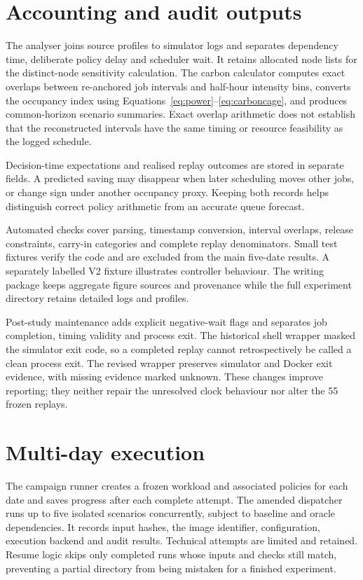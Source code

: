 \section{Accounting and audit outputs}
The analyser joins source profiles to simulator logs and separates dependency time, deliberate policy delay and scheduler wait. It retains allocated node lists for the distinct-node sensitivity calculation. The carbon calculator computes exact overlaps between re-anchored job intervals and half-hour intensity bins, converts the occupancy index using Equations~\ref{eq:power}--\ref{eq:carboncage}, and produces common-horizon scenario summaries. Exact overlap arithmetic does not establish that the reconstructed intervals have the same timing or resource feasibility as the logged schedule.

Decision-time expectations and realised replay outcomes are stored in separate fields. A predicted saving may disappear when later scheduling moves other jobs, or change sign under another occupancy proxy. Keeping both records helps distinguish correct policy arithmetic from an accurate queue forecast.

Automated checks cover parsing, timestamp conversion, interval overlaps, release constraints, carry-in categories and complete replay denominators. Small test fixtures verify the code and are excluded from the main five-date results. A separately labelled V2 fixture illustrates controller behaviour. The writing package keeps aggregate figure sources and provenance while the full experiment directory retains detailed logs and profiles.

Post-study maintenance adds explicit negative-wait flags and separates job completion, timing validity and process exit. The historical shell wrapper masked the simulator exit code, so a completed replay cannot retrospectively be called a clean process exit. The revised wrapper preserves simulator and Docker exit evidence, with missing evidence marked unknown. These changes improve reporting; they neither repair the unresolved clock behaviour nor alter the 55 frozen replays.

\section{Multi-day execution}
The campaign runner creates a frozen workload and associated policies for each date and saves progress after each complete attempt. The amended dispatcher runs up to five isolated scenarios concurrently, subject to baseline and oracle dependencies. It records input hashes, the image identifier, configuration, execution backend and audit results. Technical attempts are limited and retained. Resume logic skips only completed runs whose inputs and checks still match, preventing a partial directory from being mistaken for a finished experiment.

